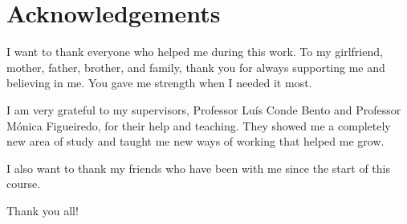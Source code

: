 


% 
% 
% 

\begingroup
\let\clearpage\relax
\let\cleardoublepage\relax
\let\cleardoublepage\relax
\chapter*{Acknowledgements}
\color{Red}
I want to thank everyone who helped me during this work. To my girlfriend, mother, father, brother, and family, thank you for always supporting me and believing in me. You gave me strength when I needed it most.

I am very grateful to my supervisors, Professor Luís Conde Bento and Professor Mónica Figueiredo, for their help and teaching. They showed me a completely new area of study and taught me new ways of working that helped me grow.

I also want to thank my friends who have been with me since the start of this course.

Thank you all!
\color{Black}
\endgroup


